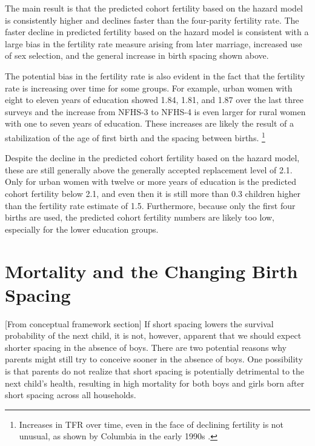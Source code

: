 \documentclass[12pt,letterpaper]{article}
\begin{document}
The main result is that the predicted cohort fertility based on the hazard model is 
consistently higher and declines faster than the four-parity fertility rate.
The faster decline in predicted fertility based on the hazard model is consistent with
a large bias in the fertility rate measure arising from later marriage, increased use of 
sex selection, and the general increase in birth spacing shown above.

The potential bias in the fertility rate is also evident in the fact that the 
fertility rate is increasing over time for some groups.
For example, urban women with eight to eleven years of education showed 1.84, 1.81, and
1.87 over the last three surveys and the increase from NFHS-3 to NFHS-4 is even larger
for rural women with one to seven years of education.
These increases are likely the result of a stabilization of the age of first birth and
the spacing between births.%
\footnote{
Increases in TFR over time, even in the face of declining fertility is not 
unusual, as shown by Columbia in the early 1990s \citep{Bongaarts1999}.
}

Despite the decline in the predicted cohort fertility based on the hazard model, these 
are still generally above the generally accepted replacement level of 2.1.
Only for urban women with twelve or more years of education is the predicted cohort
fertility below 2.1, and even then it is still more than 0.3 children higher than the 
fertility rate estimate of 1.5.
Furthermore, because only the first four births are used, the predicted cohort fertility
numbers are likely too low, especially for the lower education groups.


\section{Mortality and the Changing Birth Spacing\label{sec:mortality}}


[From conceptual framework section]
If short spacing lowers the survival probability of the next child, it is not, however, 
apparent that we should expect shorter spacing in the absence of boys.
There are two potential reasons why parents might still try to conceive sooner 
in the absence of boys.
One possibility is that parents do not realize that short spacing is potentially
detrimental to the next child's health, resulting in high mortality for both boys 
and girls born after short spacing across all households.
\end{document}
